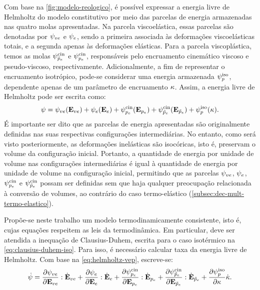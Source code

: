 \documentclass[Tese.tex]{subfiles}
\begin{document}
Com base na \autoref{fig:modelo-reologico}, é possível expressar a energia livre de Helmholtz do modelo constitutivo por meio das parcelas de energia armazenadas nas quatro molas apresentadas. Na parcela viscoelástica, essas parcelas são denotadas por $\psi_{ve}$ e $\psi_e$, sendo a primeira associada às deformações viscoelásticas totais, e a segunda apenas às deformações elásticas. Para a parcela viscoplástica, temos as molas $\psi_{\tilde{p}_e}^\text{cin}$ e $\psi_{p_e}^\text{cin}$, responsáveis pelo encruamento cinemático viscoso e pseudo-viscoso, respectivamente. Adicionalmente, a fim de representar o encruamento isotrópico, pode-se considerar uma energia armazenada $\psi_p^\text{iso}$, dependente apenas de um parâmetro de encruamento $\kappa$. Assim, a energia livre de Helmholtz pode ser escrita como:
\begin{equation}\label{eq:helmholtz-vep}
\psi = \psi_{ve}(\mathbf{E}_{ve}) + \psi_e(\mathbf{E}_e) + \psi_{p_e}^\text{cin}(\mathbf{E}_{p_e}) + \psi_{\tilde{p}_e}^\text{cin}(\mathbf{E}_{\tilde{p}_e}) + \psi_p^\text{iso}(\kappa).
\end{equation}
É importante ser dito que as parcelas de energia apresentadas são originalmente definidas nas suas respectivas configurações intermediárias. No entanto, como será visto posteriormente, as deformações inelásticas são isocóricas, isto é, preservam o volume da configuração inicial. Portanto, a quantidade de energia por unidade de volume nas configurações intermediárias é igual à quantidade de energia por unidade de volume na configuração inicial, permitindo que as parcelas $\psi_{ve}$, $\psi_e$, $\psi_{p_e}^\text{cin}$ e $\psi_{\tilde{p}_e}^\text{cin}$ possam ser definidas sem que haja qualquer preocupação relacionada à conversão de volumes, ao contrário do caso termo-elástico (\autoref{subsec:dec-mult-termo-elastico}).

Propõe-se neste trabalho um modelo termodinamicamente consistente, isto é, cujas equações respeitem as leis da termodinâmica. Em particular, deve ser atendida a inequação de Clausius-Duhem, escrita para o caso isotérmico na \cref{eq:clausius-duhem-iso}. Para isso, é necessário calcular taxa da energia livre de Helmholtz. Com base na \cref{eq:helmholtz-vep}, escreve-se:
\begin{equation}\label{eq:dotHelmholtz-0}
\dot{\psi} = \dfrac{\partial \psi_{ve}}{\partial \mathbf{E}_{ve}}:\dot{\mathbf{E}}_{ve} + \dfrac{\partial \psi_e}{\partial \mathbf{E}_e}:\dot{\mathbf{E}}_e + \dfrac{\partial \psi_{p_e}^\text{cin}}{\partial \mathbf{E}_{p_e}}:\dot{\mathbf{E}}_{p_e} + \dfrac{\partial \psi_{\tilde{p}_e}^\text{cin}}{\partial \mathbf{E}_{\tilde{p}_e}}:\dot{\mathbf{E}}_{\tilde{p}_e} + \dfrac{\partial \psi_p^\text{iso}}{\partial \kappa}\dot{\kappa}.
\end{equation}
\end{document}
